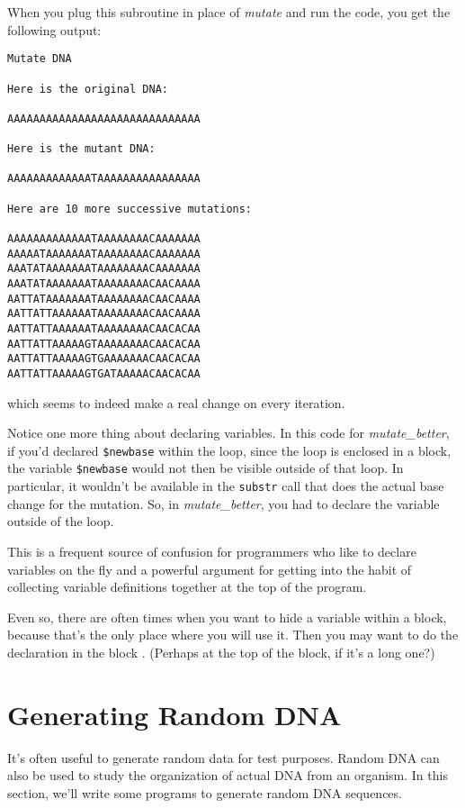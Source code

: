 When you plug this subroutine in place of \textit{mutate} and run the code, you get the following output:

\begin{lstlisting}
Mutate DNA

Here is the original DNA:

AAAAAAAAAAAAAAAAAAAAAAAAAAAAAA

Here is the mutant DNA:

AAAAAAAAAAAAATAAAAAAAAAAAAAAAA

Here are 10 more successive mutations:

AAAAAAAAAAAAATAAAAAAAACAAAAAAA
AAAAATAAAAAAATAAAAAAAACAAAAAAA
AAATATAAAAAAATAAAAAAAACAAAAAAA
AAATATAAAAAAATAAAAAAAACAACAAAA
AATTATAAAAAAATAAAAAAAACAACAAAA
AATTATTAAAAAATAAAAAAAACAACAAAA
AATTATTAAAAAATAAAAAAAACAACACAA
AATTATTAAAAAGTAAAAAAAACAACACAA
AATTATTAAAAAGTGAAAAAAACAACACAA
AATTATTAAAAAGTGATAAAAACAACACAA
\end{lstlisting}

which seems to indeed make a real change on every iteration.

Notice one more thing about declaring variables. In this code for \textit{mutate\_better}, if you'd declared \verb|$newbase| within the loop, since the loop is enclosed in a block, the variable \verb|$newbase| would not then be visible outside of that loop. In particular, it wouldn't be available in the \verb|substr| call that does the actual base change for the mutation. So, in \textit{mutate\_better}, you had to declare the variable outside of the loop.  

This is a frequent source of confusion for programmers who like to declare variables on the fly and a powerful argument for getting into the habit of collecting variable definitions together at the top of the program.

Even so, there are often times when you want to hide a variable within a block, because that's the only place where you will use it. Then you may want to do the declaration in the block . (Perhaps at the top of the block, if it's a long one?) 

\section{Generating Random DNA} 
It's often useful to generate random data for test purposes. Random DNA can also be used to study the organization of actual DNA from an organism. In this section, we'll write some programs to generate random DNA sequences.

